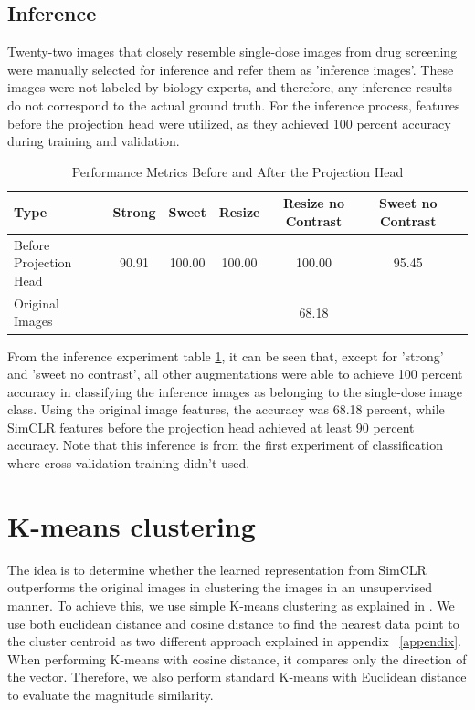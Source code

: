 \subsection{Inference}\label{subsec:inference}

Twenty-two images that closely resemble single-dose images from drug screening were manually selected for inference and refer them as 'inference images'. These images were not labeled by biology experts, and therefore, any inference results do not correspond to the actual ground truth. For the inference process, features before the projection head were utilized, as they achieved 100 percent accuracy during training and validation.
\begin{table}[H]
    \centering
    \begin{tabular}{@{}lcccccc@{}}
    \toprule
    \textbf{Type} & \textbf{Strong} & \textbf{Sweet} & \textbf{Resize} & \textbf{Resize no Contrast} & \textbf{Sweet no Contrast} \\ \midrule
    Before Projection Head & 90.91 & 100.00 & 100.00 & 100.00 & 95.45 \\ \midrule
    Original Images & & & & 68.18 & \\ \bottomrule
    \end{tabular}
    \caption{Performance Metrics Before and After the Projection Head}
    \label{tab:performance_metrics}
\end{table}

From the inference experiment table \ref{tab:performance_metrics}, it can be seen that, except for 'strong' and 'sweet no contrast', all other augmentations were able to achieve 100 percent accuracy in classifying the inference images as belonging to the single-dose image class. Using the original image features, the accuracy was 68.18 percent, while SimCLR features before the projection head achieved at least 90 percent accuracy. Note that this inference is from the first experiment of classification where cross validation training didn't used.
\section{K-means clustering}

The idea is to determine whether the learned representation from SimCLR outperforms the original images in clustering the images in an unsupervised manner. To achieve this, we use simple K-means clustering as explained in \cite{bishop:2006:PRML}. We use both euclidean distance and cosine distance to find the nearest data point to the cluster centroid as two different approach explained in appendix ~\ref{appendix}. When performing K-means with cosine distance, it compares only the direction of the vector. Therefore, we also perform standard K-means with Euclidean distance to evaluate the magnitude similarity. 
